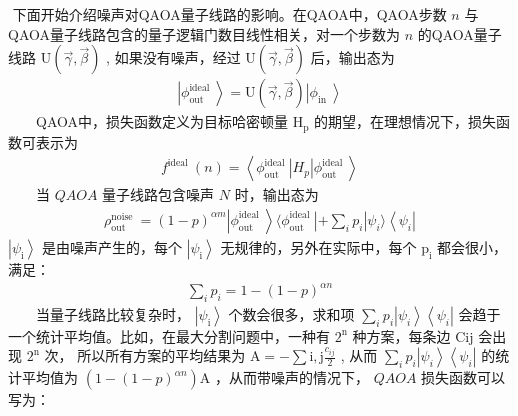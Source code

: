 \documentclass[a4paper,11pt,english]{sphinxmanual}
\begin{document}
\sphinxAtStartPar
​ 下面开始介绍噪声对QAOA量子线路的影响。在QAOA中，QAOA步数 \(n\) 与QAOA量子线路包含的量子逻辑门数目线性相关，对一个步数为 \(n\) 的QAOA量子线路 \(\mathrm{U}(\vec{\gamma}, \vec{\beta})\) , 如果没有噪声，经过 \(\mathrm{U}(\vec{\gamma}, \vec{\beta})\) 后，输出态为
\begin{equation*}
\begin{split}\left|\phi_{\text {out }}^{\text {ideal }}\right\rangle=\mathrm{U}(\vec{\gamma}, \vec{\beta})\left|\phi_{\text {in }}\right\rangle\end{split}
\end{equation*}
\sphinxAtStartPar
  QAOA中，损失函数定义为目标哈密顿量 \(\mathrm{H}_{\mathrm{p}}\) 的期望，在理想情况下，损失函数可表示为
\begin{equation*}
\begin{split}f^{\text {ideal }}(n)=\left\langle\phi_{\text {out }}^{\text {ideal }}\left|H_{p}\right| \phi_{\text {out }}^{\text {ideal }}\right\rangle\end{split}
\end{equation*}
\sphinxAtStartPar
  当  \(Q A O A\) 量子线路包含噪声 \(N\) 时，输出态为
\begin{equation*}
\begin{split}\rho_{\text {out }}^{\text {noise }}=(1-p)^{\alpha m}\left|\phi_{\text {out }}^{\text {ideal }}\right\rangle\langle\phi_{\text {out }}^{\text {ideal }}|+\sum_{i} p_{i}| \psi_{i}\rangle\left\langle\psi_{i}\right|\end{split}
\end{equation*}
\sphinxAtStartPar
\(\left|\psi_{\mathrm{i}}\right\rangle\) 是由噪声产生的，每个 \(\left|\psi_{\mathrm{i}}\right\rangle\) 无规律的，另外在实际中，每个 \(\mathrm{p}_{\mathrm{i}}\) 都会很小，满足：
\begin{equation*}
\begin{split}\sum_{i} p_{i}=1-(1-p)^{\alpha n}\end{split}
\end{equation*}
\sphinxAtStartPar
  当量子线路比较复杂时， \(\left|\psi_{\mathrm{i}}\right\rangle\) 个数会很多，求和项 \(\sum_{i} p_{i}\left|\psi_{i}\right\rangle\left\langle\psi_{i}\right|\) 会趋于一个统计平均值。比如，在最大分割问题中，一种有 \(2^{\mathrm{n}}\) 种方案，每条边  \(\mathrm{C}{\mathrm{ij}}\) 会出现 \(2^{\mathrm{n}}\) 次， 所以所有方案的平均结果为 \(\mathrm{A}=-\sum{\mathrm{i}, \mathrm{j}} \frac{c_{i j}}{2}\) , 从而 \(\sum_{i} p_{i}\left|\psi_{i}\right\rangle\left\langle\psi_{i}\right|\) 的统计平均值为 \(\left(1-(1-p)^{\alpha n}\right) \mathrm{A}\) ，从而带噪声的情况下， \(QAOA\) 损失函数可以写为：
\end{document}
